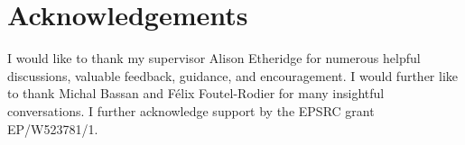 \documentclass[reqno,draft]{amsart}
\numberwithin{equation}{section}
\theoremstyle{plain}
\newtheorem{lemma}[theorem]{Lemma}
\theoremstyle{remark}
\newcommand{\N}{\mathbb{N}} %
\newcommand*\diff{\mathop{}\!\mathrm{d}}
\newcommand{\fpart}{\Pi} %
\newcommand{\rates}{R^\circ} %
\newcommand{\nurates}{R} %
\newcommand{\mergers}{M}
\DeclareMathOperator{\dct}{tm}
\DeclareMathOperator{\dcs}{sp}
\newcommand{\ftm}{f_\mathrm{tm}^{\boldsymbol \lambda}}
\newcommand{\fsp}{f_\mathrm{sp}}
\newcommand{\nunk}{\nu_{n,\smash{\vec{k}}}}
\newcommand{\lank}{\lambda_{n,\smash{\vec{k}}}}
\newcommand{\pnk}{p_{n,\smash{\vec{k}}}}
\begin{document}
%
%

\section*{Acknowledgements}
I would like to thank my supervisor Alison Etheridge for numerous helpful discussions, valuable feedback, guidance, and encouragement. I would further like to thank Michal Bassan and F{\'e}lix Foutel-Rodier for many insightful conversations. I further acknowledge support by the EPSRC grant EP/W523781/1.
\end{document}
